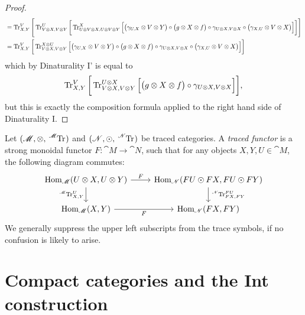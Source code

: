 \documentclass[12pt,oneside,article,draft]{memoir}
\begin{document}
\begin{proof}
{\begin{align*}
  &=\operatorname{Tr}^V_{X,Y}\Bigg[\operatorname{Tr}^U_{V\otimes X,V\otimes Y}\bigg[\operatorname{Tr}^X_{U\otimes V\otimes X,U\otimes V\otimes Y}\Big[\big(\gamma_{U,X}\otimes V\otimes Y\big)\circ\big(g\otimes X\otimes f\big)\circ\gamma_{U\otimes X, V\otimes X}\circ\big(\gamma_{X,U}\otimes V\otimes X\big)\Big]\bigg]\Bigg]\\
  &=\operatorname{Tr}^V_{X,Y}\bigg[\operatorname{Tr}^{X\otimes U}_{V\otimes X,V\otimes Y}\Big[\big(\gamma_{U,X}\otimes V\otimes Y\big)\circ\big(g\otimes X\otimes f\big)\circ\gamma_{U\otimes X, V\otimes X}\circ\big(\gamma_{X,U}\otimes V\otimes X\big)\Big]\bigg]
 \end{align*}
 which by Dinaturality I' is equal to
 \[\operatorname{Tr}^V_{X,Y}\bigg[\operatorname{Tr}^{U\otimes X}_{V\otimes X,V\otimes Y}\Big[\big(g\otimes X\otimes f\big)\circ\gamma_{U\otimes X, V\otimes X}\Big]\bigg],\]
 but this is exactly the composition formula applied to the right hand side of Dinaturality I.}%
\end{proof}

\begin{definition}\label{def:traced functor}

Let $(\cat{M},\otimes,\tensor*[^{\cat{M}}]{\Tr}{})$ and $(\cat{N},\odot,\tensor*[^{\cat{N}}]{\Tr}{})$ be traced categories. A \emph{traced functor} is a strong monoidal functor $F\colon\cat{M}\to\cat{N}$, such that for any objects $X,Y,U\in\cat{M}$, the following diagram commutes:
$$
\begin{tikzcd}
	\Hom_{\cat{M}}(U\otimes X,U\otimes Y)
		\rar{F}
		\dar[swap]{\tensor*[^{\cat{M}}]{\Tr}{^U_{X,Y}}}
	& \Hom_{\cat{N}}(FU\odot FX,FU\odot FY)
		\dar{\tensor*[^{\cat{N}}]{\Tr}{^{FU}_{FX,FY}}} \\
	\Hom_{\cat{M}}(X,Y)
		\rar[swap]{F}
	& \Hom_{\cat{N}}(FX,FY)
\end{tikzcd}
$$
We generally suppress the upper left subscripts from the trace symbols, if no confusion is likely to arise.

\end{definition}

\section{Compact categories and the Int construction}
\end{document}
